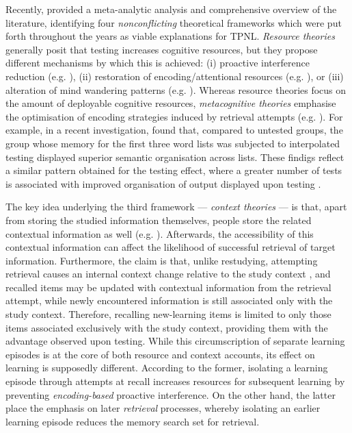 \documentclass[../main.tex]{subfiles}
\begin{document}
Recently, \cite{chanRetrievalPotentiatesNew2018} provided a meta-analytic analysis and comprehensive overview of the literature, identifying four \textit{nonconflicting} theoretical frameworks which were put forth throughout the years as viable explanations for TPNL. \textit{Resource theories} generally posit that testing increases cognitive resources, but they propose different mechanisms by which this is achieved: (i) proactive interference reduction (e.g. \citealp{wahlheimTestingCanCounteract2015, weinsteinTestingProtectsProactive2011, szpunarTestingStudyInsulates2008, nunesTestingImprovesTrue2012}), (ii) restoration of encoding/attentional resources (e.g. \citealp{pastotterRetrievalLearningFacilitates2011}), or (iii) alteration of mind wandering patterns (e.g. \citealp{jingInterpolatedTestingInfluences2016,szpunarInterpolatedMemoryTests2013,szpunarMindWanderingEducation2013}). Whereas resource theories focus on the amount of deployable cognitive resources, \textit{metacognitive theories} emphasise the optimisation of encoding strategies induced by retrieval attempts (e.g. \citealp{choTestingEnhancesBoth2017, chanTestingPotentiatesNew2018}). For example, in a recent investigation, \cite{chanTestingPotentiatesNew2018} found that, compared to untested groups, the group whose memory for the first three word lists was subjected to interpolated testing displayed superior semantic organisation across lists. These findigs reflect a similar pattern obtained for the testing effect, where a greater number of tests is associated with improved organisation of output displayed upon testing \citep{karpickeRetrievalBasedLearningActive2012,zarombTestingEffectFree2010}.

The key idea underlying the third framework --- \textit{context theories} --- is that, apart from storing the studied information themselves, people store the related contextual information as well (e.g. \citealp{lehmanEpisodicContextAccount2014}). Afterwards, the accessibility of this contextual information can affect the likelihood of successful retrieval of target information. Furthermore, the claim is that, unlike restudying, attempting retrieval causes an internal context change relative to the study context \citep{jangContextRetrievalContext2008, sahakyanContextualChangeAccount2002}, and recalled items may be updated with contextual information from the retrieval attempt, while newly encountered information is still associated only with the study context. Therefore, recalling new-learning items is limited to only those items associated exclusively with the study context, providing them with the advantage observed upon testing. While this circumscription of separate learning episodes is at the core of both resource and context accounts, its effect on learning is supposedly different. According to the former, isolating a learning episode through attempts at recall increases resources for subsequent learning by preventing \textit{encoding-based} proactive interference. On the other hand, the latter place the emphasis on later \textit{retrieval} processes, whereby isolating an earlier learning episode reduces the memory search set for retrieval.
\end{document}
